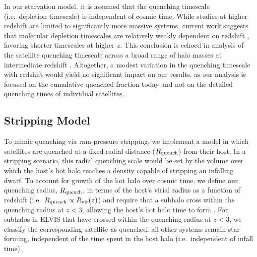 In our starvation model, it is assumed that the quenching timescale
(i.e.~depletion timescale) is independent of cosmic time. While
studies at higher redshift are limited to significantly more massive
systems, current work suggests that molecular depletion timescales are
relatively weakly dependent on redshift \citep{geach11, magdis12a,
  saintogne13, bauermeister13}, favoring shorter timescales at higher
$z$. This conclusion is echoed in analysis of the satellite quenching
timescale across a broad range of halo masses at intermediate redshift
\citep{mcgee11, mcgee14, mok14, muzzin14, bahe15}. Altogether, a
modest variation in the quenching timescale with redshift would yield
no significant impact on our results, as our analysis is focused on
the cumulative quenched fraction today and not on the detailed
quenching times of individual satellites.







\subsection{Stripping Model}
\label{subsec:rquench}

To mimic quenching via ram-pressure stripping, we implement a model in
which satellites are quenched at a fixed radial distance ($R_{\rm
  quench}$) from their host. In a stripping scenario, this radial
quenching scale would be set by the volume over which the host's hot
halo reaches a density capable of stripping an infalling dwarf. To
account for growth of the hot halo over cosmic time, we define our
quenching radius, $R_{\rm quench}$, in terms of the host's virial
radius as a function of redshift (i.e.~$R_{\rm quench} \propto R_{\rm
  vir}(z)$) and require that a subhalo cross within the quenching
radius at $z < 3$, allowing the host's hot halo time to form
\citep{birnboim03, keres05, dekel06}. For subhalos in ELVIS that have
crossed within the quenching radius at $z < 3$, we classify the
corresponding satellite as quenched; all other systems remain
star-forming, independent of the time spent in the host halo
(i.e.~independent of infall time).


